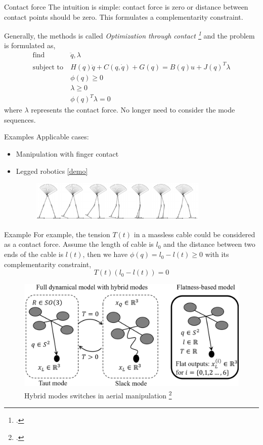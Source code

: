 \documentclass{beamer}
\newcommand{\red}[1]{{\color{red} #1}}
\begin{document}
\begin{frame}{Contact force}
	The intuition is simple: contact force is zero or distance between contact points should be zero. This formulates a complementarity constraint.
	
	\vspace{\baselineskip}
	Generally, the methods is called \emph{Optimization through contact \footcite{posa2014direct}} and the problem is formulated as,
	\begin{align*}
		\text{find} \ & \ddot{q}, \lambda \\
		\text{subject to} \ & H(q) \ddot{q} + C(q, \dot{q}) + G(q) = B(q) u + J(q)^T \lambda \\
		& \phi(q) \geq 0 \\
		& \lambda \geq 0 \\
		& \phi(q)^T \lambda  = 0
	\end{align*}
	where $\lambda$ represents the contact force. \red{No longer need to consider the mode sequences.}
\end{frame}

\begin{frame}{Examples}
	Applicable cases:
	\begin{itemize}
		\item Manipulation with finger contact
		\item Legged robotics \href{https://www.youtube.com/watch?v=pH1pDXnCBx4}{[demo]}
		\begin{figure}
			\includegraphics[width=0.8\textwidth]{figures/flamingo.png}
		\end{figure}
	\end{itemize}
	
\end{frame}

\begin{frame}{Example}
	For example, the tension $T(t)$ in a massless cable could be considered as a contact force. Assume the length of cable is $l_0$ and the distance between two ends of the cable is $l(t)$, then we have $\phi(q) = l_0 - l(t) \geq 0$ with its complementarity constraint,
	\begin{equation*}
	T(t) (l_0 - l(t)) = 0
	\end{equation*}
	\begin{figure}
		\includegraphics[width=0.6\linewidth]{figures/hybrid_mode_aerial_manipulation.png}
		\caption{Hybrid modes switches in aerial manipulation \footcite{zeng2020differential}}
	\end{figure}
\end{frame}
\end{document}
